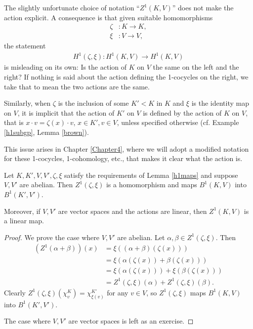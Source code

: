 \begin{remark}
	The slightly unfortunate choice of notation ``$Z^1(K, V)$'' does not make the action explicit. A consequence is that given suitable homomorphisms
	\begin{align*}
		\zeta&:K \rightarrow K, \\
		\xi&: V \rightarrow V,
	\end{align*}
	the statement
	\begin{align*}
		H^1(\zeta, \xi):H^1(K, V) \rightarrow H^1(K, V)
	\end{align*}
	is misleading on its own: Is the action of $K$ on $V$ the same on the left and the right? If nothing is said about the action defining the 1-cocycles on the right, we take that to mean the two actions are the same.

	Similarly, when $\zeta$ is the inclusion of some $K' < K$ in $K$ and $\xi$ is the identity map on $V$, it is implicit that the action of $K'$ on $V$ is defined by the action of $K$ on $V$, that is $x \cdot v = \zeta(x) \cdot v$, $x \in K', v \in V$, unless specified otherwise (cf. Example \ref{h1subgp}, Lemma \ref{brown}).

This issue arises in Chapter \ref{Chapter4}, where we will adopt a modified notation for these 1-cocycles, 1-cohomology, etc., that makes it clear what the action is.
\end{remark}

\begin{lemma} \label{zlinear} Let $K,K',V,V',\zeta,\xi$ satisfy the requirements of Lemma \ref{h1maps} and suppose $V,V'$ are abelian. Then $Z^1(\zeta, \xi)$ is a homomorphism and maps $B^1(K, V)$ into $B^1(K', V')$.

Moreover, if $V, V'$ are vector spaces and the actions are linear, then $Z^1(K, V)$ is a linear map.
\end{lemma}
\begin{proof}
	We prove the case where $V, V'$ are abelian. Let $\alpha, \beta \in Z^1(\zeta, \xi)$. Then
\begin{align*}
	\left(Z^1(\alpha + \beta)\right)(x) &= \xi\left((\alpha + \beta)(\zeta(x))\right) \\
		&= \xi\left(\alpha(\zeta(x)) + \beta(\zeta(x))\right) \\
		&= \xi\left(\alpha(\zeta(x))\right) + \xi\left(\beta(\zeta(x))\right) \\
		&= Z^1(\zeta, \xi)(\alpha) + Z^1(\zeta, \xi)(\beta).
\end{align*}
Clearly $Z^1(\zeta, \xi)\left(\chi^K_v\right) = \chi^{K'}_{\xi(v)}$ for any $v\in V$, so $Z^1(\zeta, \xi)$ maps $B^1(K, V)$ into $B^1(K', V')$.

The case where $V, V'$ are vector spaces is left as an exercise.
\end{proof}

